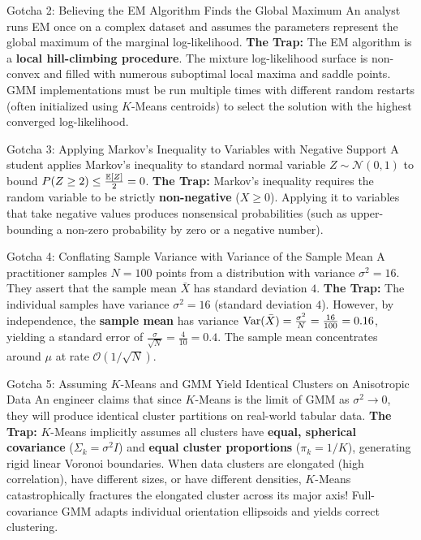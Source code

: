 \begin{trapbox}{Gotcha 2: Believing the EM Algorithm Finds the Global Maximum}
An analyst runs EM once on a complex dataset and assumes the parameters represent the global maximum of the marginal log-likelihood.
\textbf{The Trap:} The EM algorithm is a \textbf{local hill-climbing procedure}. The mixture log-likelihood surface is non-convex and filled with numerous suboptimal local maxima and saddle points. GMM implementations must be run multiple times with different random restarts (often initialized using $K$-Means centroids) to select the solution with the highest converged log-likelihood.
\end{trapbox}

\begin{trapbox}{Gotcha 3: Applying Markov's Inequality to Variables with Negative Support}
A student applies Markov's inequality to standard normal variable $Z \sim \mathcal{N}(0, 1)$ to bound $P(Z \ge 2) \le \frac{\operatorname{\mathbb{E}}[Z]}{2} = 0$.
\textbf{The Trap:} Markov's inequality requires the random variable to be strictly \textbf{non-negative} ($X \ge 0$). Applying it to variables that take negative values produces nonsensical probabilities (such as upper-bounding a non-zero probability by zero or a negative number).
\end{trapbox}

\begin{trapbox}{Gotcha 4: Conflating Sample Variance with Variance of the Sample Mean}
A practitioner samples $N = 100$ points from a distribution with variance $\sigma^2 = 16$. They assert that the sample mean $\bar{X}$ has standard deviation $4$.
\textbf{The Trap:} The individual samples have variance $\sigma^2 = 16$ (standard deviation $4$). However, by independence, the \textbf{sample mean} has variance $\operatorname{Var}(\bar{X}) = \frac{\sigma^2}{N} = \frac{16}{100} = 0.16$, yielding a standard error of $\frac{\sigma}{\sqrt{N}} = \frac{4}{10} = 0.4$. The sample mean concentrates around $\mu$ at rate $\mathcal{O}(1/\sqrt{N})$.
\end{trapbox}

\begin{trapbox}{Gotcha 5: Assuming $K$-Means and GMM Yield Identical Clusters on Anisotropic Data}
An engineer claims that since $K$-Means is the limit of GMM as $\sigma^2 \to 0$, they will produce identical cluster partitions on real-world tabular data.
\textbf{The Trap:} $K$-Means implicitly assumes all clusters have \textbf{equal, spherical covariance} ($\Sigma_k = \sigma^2 I$) and \textbf{equal cluster proportions} ($\pi_k = 1/K$), generating rigid linear Voronoi boundaries. When data clusters are elongated (high correlation), have different sizes, or have different densities, $K$-Means catastrophically fractures the elongated cluster across its major axis! Full-covariance GMM adapts individual orientation ellipsoids and yields correct clustering.
\end{trapbox}

